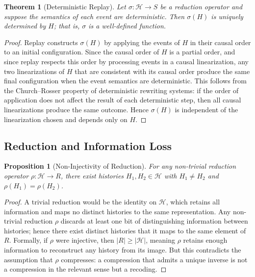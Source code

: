 \documentclass[12pt]{article}
\newtheorem{proposition}{Proposition}
\newtheorem{theorem}{Theorem}
\begin{document}
\begin{theorem}[Deterministic Replay]
\label{thm:replay}
Let $\sigma : \mathcal{H} \rightarrow S$ be a reduction operator and suppose the semantics of each event are deterministic. Then $\sigma(H)$ is uniquely determined by $H$; that is, $\sigma$ is a well-defined function.
\end{theorem}

\begin{proof}
Replay constructs $\sigma(H)$ by applying the events of $H$ in their causal order to an initial configuration. Since the causal order of $H$ is a partial order, and since replay respects this order by processing events in a causal linearization, any two linearizations of $H$ that are consistent with its causal order produce the same final configuration when the event semantics are deterministic. This follows from the Church--Rosser property of deterministic rewriting systems: if the order of application does not affect the result of each deterministic step, then all causal linearizations produce the same outcome. Hence $\sigma(H)$ is independent of the linearization chosen and depends only on $H$.
\end{proof}

\subsection{Reduction and Information Loss}

\begin{proposition}[Non-Injectivity of Reduction]
For any non-trivial reduction operator $\rho : \mathcal{H} \rightarrow R$, there exist histories $H_1, H_2 \in \mathcal{H}$ with $H_1 \neq H_2$ and $\rho(H_1) = \rho(H_2)$.
\end{proposition}

\begin{proof}
A trivial reduction would be the identity on $\mathcal{H}$, which retains all information and maps no distinct histories to the same representation. Any non-trivial reduction $\rho$ discards at least one bit of distinguishing information between histories; hence there exist distinct histories that it maps to the same element of $R$. Formally, if $\rho$ were injective, then $|R| \geq |\mathcal{H}|$, meaning $\rho$ retains enough information to reconstruct any history from its image. But this contradicts the assumption that $\rho$ compresses: a compression that admits a unique inverse is not a compression in the relevant sense but a recoding.
\end{proof}
\end{document}
